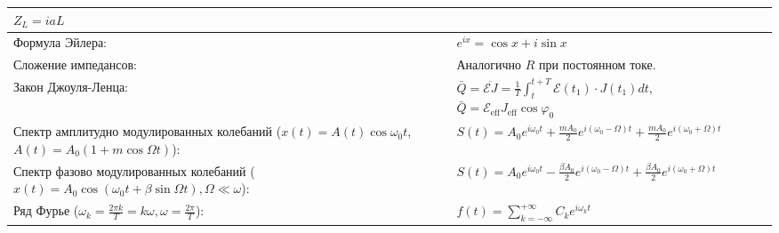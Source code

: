 \documentclass{article}
\begin{document}
\begin{tabular}{ |p{6cm}|p{3cm}|p{6cm}|p{3.5cm}|  }
$Z_L = i a L$                                                              &
                                                                           &
                                                                           \\
\hline
Формула Эйлера:                                                            &
$e^{i x}=\cos x+i \sin x$                                                  &
                                                                           &
                                                                           \\
\hline
Сложение импедансов:                                                       &
Аналогично $R$ при постоянном токе.                                        &
                                                                           &
                                                                           \\
\hline
Закон Джоуля-Ленца:                                                        &
$\bar{Q}=\overline{\mathcal{E} J}=\frac{1}{T} \int_{t}^{t+T} \mathcal{E}\left(t_{1}\right) \cdot J\left(t_{1}\right) d t$,
$\bar{Q}=\mathcal{E}_{\mathrm{eff}} J_{\mathrm{eff}} \cos \varphi_{0}$     &
                                                                           &
                                                                           \\
\hline
Спектр амплитудно модулированных колебаний ($x(t)=A(t) \cos \omega_{0} t$, $A(t)=A_{0}(1+m \cos \Omega t)$):&
$S(t)=A_{0} e^{i \omega_{0} t}+\frac{m A_{0}}{2} e^{i\left(\omega_{0}-\Omega\right) t}+\frac{m A_{0}}{2} e^{i\left(\omega_{0}+\Omega\right) t}$&
                                                                           &
                                                                           \\
\hline
Спектр фазово модулированных колебаний ($x(t)=A_{0} \cos \left(\omega_{0} t+\beta \sin \Omega t\right), \Omega \ll \omega$):&
$S(t)=A_{0} e^{i \omega_{0} t}-\frac{\beta A_{0}}{2} e^{i\left(\omega_{0}-\Omega\right) t}+\frac{\beta A_{0}}{2} e^{i\left(\omega_{0}+\Omega\right) t}$&
                                                                           &
                                                                           \\
\hline
Ряд Фурье ($\omega_{k}=\frac{2 \pi k}{T}=k \omega, \omega=\frac{2 \pi}{T}$):&
$f(t)=\sum_{k=-\infty}^{+\infty} C_{k} e^{i \omega_{k} t}$                 &
                                                                           &

\end{tabular}
\end{document}
